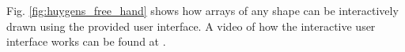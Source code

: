 Fig. \ref{fig:huygens_free_hand} shows how arrays of any shape can be interactively drawn using the provided user interface. A video of how the interactive user interface works can be found at \cite{hos}.

%
%



%
%


